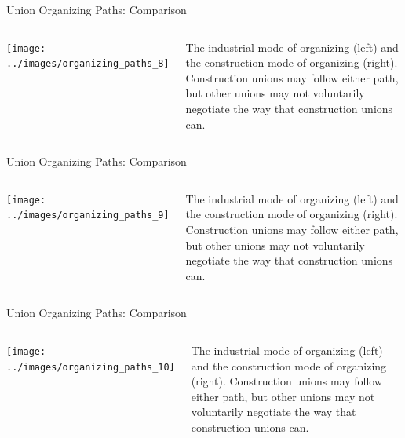 \documentclass{beamer}
\begin{document}
\begin{frame}{Union Organizing Paths: Comparison} %
  \begin{columns}
    \texttt{[image: ../images/organizing\_paths\_8]}

    The industrial mode of organizing (left) and the construction mode of organizing (right).\newline\newline
    Construction unions may follow either path, but other unions may not voluntarily negotiate the way that construction unions can.
    \end{columns}
\end{frame}

\begin{frame}{Union Organizing Paths: Comparison} %
  \begin{columns}
    \texttt{[image: ../images/organizing\_paths\_9]}

    The industrial mode of organizing (left) and the construction mode of organizing (right).\newline\newline
    Construction unions may follow either path, but other unions may not voluntarily negotiate the way that construction unions can.
    \end{columns}
\end{frame}

\begin{frame}{Union Organizing Paths: Comparison} %
  \begin{columns}
    \texttt{[image: ../images/organizing\_paths\_10]}

    The industrial mode of organizing (left) and the construction mode of organizing (right).\newline\newline
    Construction unions may follow either path, but other unions may not voluntarily negotiate the way that construction unions can.
    \end{columns}
\end{frame}
\end{document}

